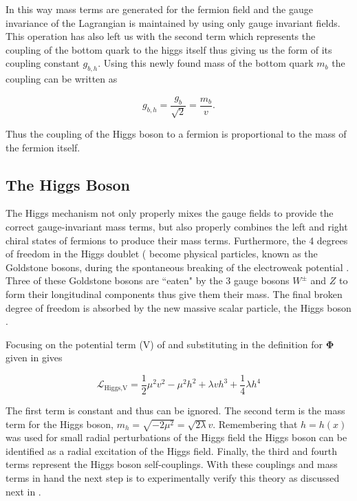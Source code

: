 In this way mass terms are generated for the fermion field and the gauge
invariance of the Lagrangian is maintained by using only gauge invariant
fields.  This operation has also left us with the second term which represents
the coupling of the bottom quark to the higgs itself thus giving us the form of its
coupling constant $g_{b,h}$.  Using this newly found mass of the bottom quark
$m_{b}$ the coupling can be written as

\begin{equation}
g_{b,h} = \frac{g_{b}}{\sqrt{2}} = \frac{m_{b}}{v}.
\end{equation}

Thus the coupling of the Higgs boson to a fermion is proportional
to the mass of the fermion itself. 
 
\subsection{The Higgs Boson}

The Higgs mechanism not only properly mixes the gauge fields to provide the
correct gauge-invariant mass terms, but also properly combines the left and
right chiral states of fermions to produce their mass terms. Furthermore, the 4
degrees of freedom in the Higgs doublet ( become
physical particles, known as the Goldstone bosons, during the spontaneous
breaking of the electroweak potential \cite{Higgs:1964pj}.  Three of these
Goldstone bosons are ``eaten" by the 3 gauge bosons $W^{\pm}$ and $Z$ to form
their longitudinal components thus give them their mass. The final broken
degree of freedom is absorbed by the new massive scalar particle, the Higgs
boson \cite{Higgs:1964pj}.

Focusing on the potential term (V) of
 and substituting in the definition for
$\boldsymbol{\Phi}$ given in  gives

\begin{equation}
\mathcal{L}_\text{Higgs,V} = \frac{1}{2} \mu^{2} v^{2} - \mu^{2} h^{2} +
\lambda v h^{3} + \frac{1}{4} \lambda h^{4}
\end{equation}

The first term is constant and thus can be ignored.  The second term is the
mass term for the Higgs boson, $m_h = \sqrt{-2\mu^{2}} = \sqrt{2\lambda}v$.
Remembering that $h = h(x)$ was used for small radial perturbations of the
Higgs field the Higgs boson can be identified as a radial excitation of the
Higgs field.  Finally, the third and fourth terms represent the Higgs boson
self-couplings.  With these couplings and mass terms in hand the next step is
to experimentally verify this theory as discussed next in .

